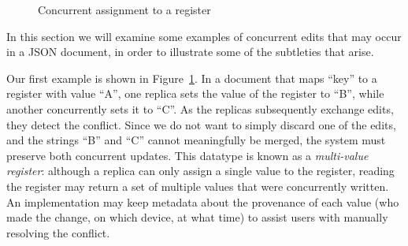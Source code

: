 \documentclass[10pt,journal,compsoc]{IEEEtran}
\begin{document}
\begin{figure}
\centering
{}
\caption{Concurrent assignment to a register}\label{fig:register-assign}
\end{figure}

In this section we will examine some examples of concurrent edits that may occur in a JSON document, in order to illustrate some of the subtleties that arise.

Our first example is shown in Figure~\ref{fig:register-assign}. In a document that maps ``key'' to a register with value ``A'', one replica sets the value of the register to ``B'', while another concurrently sets it to ``C''. As the replicas subsequently exchange edits, they detect the conflict. Since we do not want to simply discard one of the edits, and the strings ``B'' and ``C'' cannot meaningfully be merged, the system must preserve both concurrent updates. This datatype is known as a \emph{multi-value register}: although a replica can only assign a single value to the register, reading the register may return a set of multiple values that were concurrently written. An implementation may keep metadata about the provenance of each value (who made the change, on which device, at what time) to assist users with manually resolving the conflict.
\end{document}
